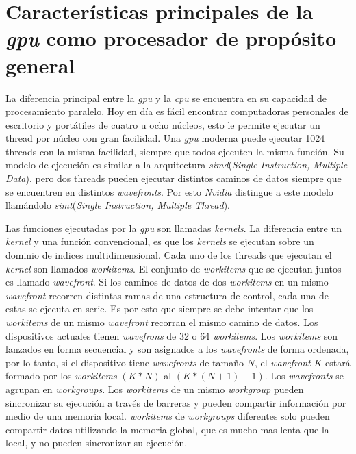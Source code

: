 
\chapter{Características principales de la \emph{gpu} como procesador de
propósito general}

La diferencia principal entre la \emph{gpu} y la \emph{cpu} se encuentra en su
capacidad de procesamiento paralelo. Hoy en día es fácil encontrar computadoras
personales de escritorio y portátiles de cuatro u ocho núcleos, esto le permite
ejecutar un thread por núcleo con gran facilidad. Una \emph{gpu} moderna puede
ejecutar 1024 threads con la misma facilidad, siempre que todos ejecuten la
misma función. Su modelo de ejecución es similar a la arquitectura
\emph{simd}(\emph{Single Instruction, Multiple Data}), pero dos threads pueden
ejecutar distintos caminos de datos siempre que se encuentren en distintos
\emph{wavefronts}. Por esto \emph{Nvidia} distingue a este modelo llamándolo
\emph{simt}(\emph{Single Instruction, Multiple Thread}).

Las funciones ejecutadas por la \emph{gpu} son llamadas \emph{kernels}. La
diferencia entre un \emph{kernel} y una función convencional, es que los
\emph{kernels} se ejecutan sobre un dominio de indices multidimensional. Cada
uno de los threads que ejecutan el \emph{kernel} son llamados \emph{workitems}.
El conjunto de \emph{workitems} que se ejecutan juntos es llamado
\emph{wavefront}. Si los caminos de datos de dos \emph{workitems} en un mismo
\emph{wavefront} recorren distintas ramas de una estructura de control, cada una
de estas se ejecuta en serie. Es por esto que siempre se debe intentar que los
\emph{workitems} de un mismo \emph{wavefront} recorran el mismo camino de datos.
Los dispositivos actuales tienen \emph{wavefrons} de 32 o 64 \emph{workitems}.
Los \emph{workitems} son lanzados en forma secuencial y son asignados a los
\emph{wavefronts} de forma ordenada, por lo tanto, si el dispositivo tiene
\emph{wavefronts} de tamaño $N$, el \emph{wavefront} $K$ estará formado por los
\emph{workitems} $(K*N)$ al $(K*(N+1)-1)$. Los \emph{wavefronts} se agrupan en
\emph{workgroups}. Los \emph{workitems} de un mismo \emph{workgroup} pueden
sincronizar su ejecución a través de barreras y pueden compartir información por
medio de una memoria local. \emph{workitems} de \emph{workgroups} diferentes
solo pueden compartir datos utilizando la memoria global, que es mucho mas lenta
que la local, y no pueden sincronizar su ejecución.


